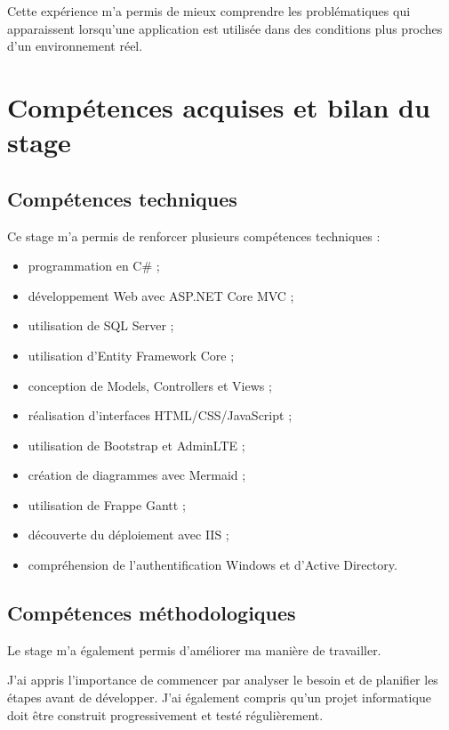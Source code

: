 \documentclass[12pt,a4paper,oneside]{report}
\begin{document}
Cette expérience m'a permis de mieux comprendre les problématiques qui apparaissent lorsqu'une application est utilisée dans des conditions plus proches d'un environnement réel.

\chapter{Compétences acquises et bilan du stage}

\section{Compétences techniques}

Ce stage m'a permis de renforcer plusieurs compétences techniques :

\begin{itemize}
    \item programmation en C\# ;
    \item développement Web avec ASP.NET Core MVC ;
    \item utilisation de SQL Server ;
    \item utilisation d'Entity Framework Core ;
    \item conception de Models, Controllers et Views ;
    \item réalisation d'interfaces HTML/CSS/JavaScript ;
    \item utilisation de Bootstrap et AdminLTE ;
    \item création de diagrammes avec Mermaid ;
    \item utilisation de Frappe Gantt ;
    \item découverte du déploiement avec IIS ;
    \item compréhension de l'authentification Windows et d'Active Directory.
\end{itemize}

\section{Compétences méthodologiques}

Le stage m'a également permis d'améliorer ma manière de travailler.

J'ai appris l'importance de commencer par analyser le besoin et de planifier les étapes avant de développer. J'ai également compris qu'un projet informatique doit être construit progressivement et testé régulièrement.
\end{document}
